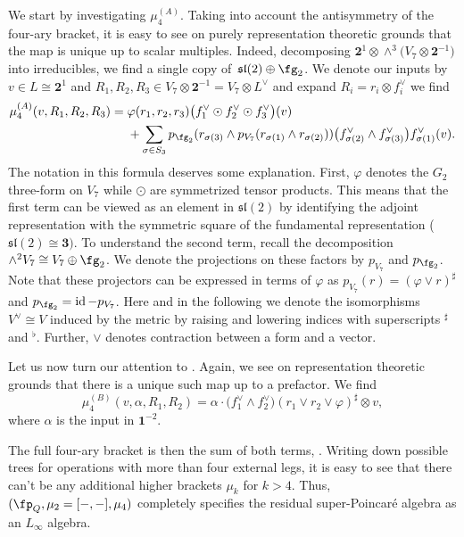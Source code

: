 \documentclass[10pt,a4paper]{amsart}
\numberwithin{equation}{section}
\theoremstyle{definition}
\DeclareMathOperator{\id}{id}
\begin{document}
We start by investigating $\mu_4^{(A)}$.
Taking into account the antisymmetry of the four-ary bracket, it is easy to see on purely representation theoretic grounds that the map is unique up to scalar multiples. Indeed, decomposing $\textbf{2}^1 \otimes \wedge^3\big(V_7 \otimes \textbf{2}^{-1}\big)$ into irreducibles, we find a single copy of~${\mathfrak{sl}(2) \oplus \fg_2}$. We denote our inputs by $v \in L \cong \textbf{2}^1$ and $R_1,R_2,R_3 \in V_7 \otimes \textbf{2}^{-1} = V_7 \otimes L^\vee$ and expand $R_i = r_i \otimes f_i^\vee$ we find
\begin{align*}%
 \mu_4^{(A)}(v, R_1, R_2 , R_3)
 ={}& \varphi(r_1,r_2,r_3) \big(f_1^\vee \odot f_2^\vee \odot f_3^\vee\big)(v) \\
 &+ \sum_{\sigma \in S_3} p_{\fg_2}( r_{\sigma(3)} \wedge p_{V_7}(r_{\sigma(1)} \wedge r_{\sigma(2)})) \big(f^\vee_{\sigma(2)} \wedge f^\vee_{\sigma(3)}\big) f^\vee_{\sigma(1)}(v).
\end{align*}
The notation in this formula deserves some explanation. First, $\varphi$ denotes the $G_2$ three-form on $V_7$ while $\odot$ are symmetrized tensor products. This means that the first term can be viewed as an element in $\mathfrak{sl}(2)$ by identifying the adjoint representation with the symmetric square of the fundamental representation ($\mathfrak{sl}(2) \cong \textbf{3})$. To understand the second term, recall the decomposition
$
 \wedge^2 V_7 \cong V_7 \oplus \fg_2 $.
We denote the projections on these factors by $p_{V_7}$ and $p_{\fg_2}$. Note that these projectors can be expressed in terms of $\varphi$ as
$
 p_{V_7}(r) = (\varphi \vee r)^\sharp$ and $ p_{\fg_2} = \id - p_{V_7}$.
Here and in the following we denote the isomorphisms $V^\vee \cong V$ induced by the metric by raising and lowering indices with superscripts $^\sharp$ and $^\flat$. Further, $\vee$ denotes contraction between a form and a vector.

Let us now turn our attention to .
Again, we see on representation theoretic grounds that there is a unique such map up to a prefactor. We find
\[
 \mu_4^{(B)}(v, \alpha, R_1, R_2) = \alpha \cdot \big(f_1^\vee \wedge f_2^\vee\big) (r_1 \vee r_2 \vee \varphi)^\sharp \otimes v ,
\]
where $\alpha$ is the input in $\textbf{1}^{-2}$.

The full four-ary bracket is then the sum of both terms, . Writing down possible trees for operations with more than four external legs, it is easy to see that there can't be any additional higher brackets $\mu_k$ for $k>4$. Thus, $(\fp_Q , \mu_2 = [-,-] , \mu_4)$ completely specifies the residual super-Poincar\'e algebra as an $L_\infty$ algebra.
\end{document}

